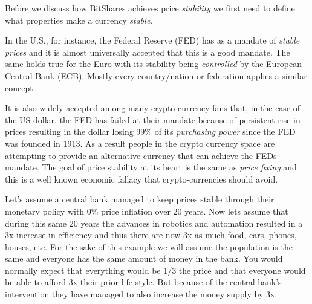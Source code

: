 Before we discuss how BitShares achieves price \emph{stability} we first need to
define what properties make a currency \emph{stable}.

In the U.S., for instance, the Federal Reserve (FED) has as a mandate of
\emph{stable prices} and it is almost universally accepted that this is a good
mandate. The same holds true for the Euro with its stability being
\emph{controlled} by the European Central Bank (ECB). Mostly every
country/nation or federation applies a similar concept.

It is also widely accepted among many crypto-currency fans that, in the case of
the US dollar, the FED has failed at their mandate because of persistent rise
in prices resulting in the dollar losing 99\% of its \emph{purchasing power}
since the FED was founded in 1913. As a result people in the crypto currency
space are attempting to provide an alternative currency that can achieve the
FEDs mandate. The goal of price stability at its heart is the same as
\emph{price fixing} and this is a well known economic fallacy that
crypto-currencies should avoid.


Let's assume a central bank managed to keep prices stable through their monetary
policy with 0\% price inflation over 20 years. Now lets assume that during this
same 20 years the advances in robotics and automation resulted in a 3x increase
in efficiency and thus there are now 3x as much food, cars, phones, houses,
etc. For the sake of this example we will assume the population is the same and
everyone has the same amount of money in the bank. You would normally expect
that everything would be 1/3 the price and that everyone would be able to
afford 3x their prior life style. But because of the central bank's
intervention they have managed to also increase the money supply by 3x.



